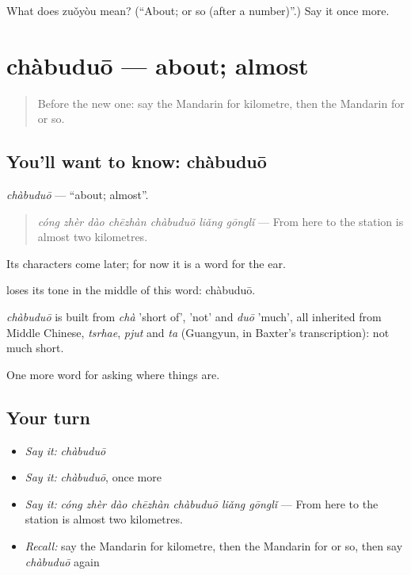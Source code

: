 \begin{tcolorbox}[breakable,colback=teal!4,colframe=teal!35!black,title={Before you move on}]
What does zuǒyòu mean? (\textquotedblleft{}About; or so (after a number)\textquotedblright{}.) Say it once more.
\end{tcolorbox}
\section[chàbuduō]{chàbuduō — about; almost}

\label{lesson:ZH-C205-chabuduo}



\begin{quote}
Before the new one: say the Mandarin for kilometre, then the Mandarin for or so.
\end{quote}

\subsection*{You'll want to know: chàbuduō}
\emph{chàbuduō} — \textquotedblleft{}about; almost\textquotedblright{}.

\begin{quote}
\emph{cóng zhèr dào chēzhàn chàbuduō liǎng gōnglǐ} — From here to the station is almost two kilometres.
\end{quote}

Its characters come later; for now it is a word for the ear.

 loses its tone in the middle of this word: chàbuduō.

\begin{cousinweb}
\emph{chàbuduō} is built from \emph{chà} 'short of',  'not' and \emph{duō} 'much', all inherited from Middle Chinese, \emph{tsrhae}, \emph{pjut} and \emph{ta} (Guangyun, in Baxter's transcription): not much short.
\end{cousinweb}

\begin{grammarlens}[title={What you've built}]
One more word for asking where things are.
\end{grammarlens}

\subsection*{Your turn}
\begin{itemize}
\raggedright
  \item \emph{Say it:} \emph{chàbuduō}
  \item \emph{Say it:} \emph{chàbuduō}, once more
  \item \emph{Say it:} \emph{cóng zhèr dào chēzhàn chàbuduō liǎng gōnglǐ} — From here to the station is almost two kilometres.
  \item \emph{Recall:} say the Mandarin for kilometre, then the Mandarin for or so, then say \emph{chàbuduō} again
\end{itemize}

